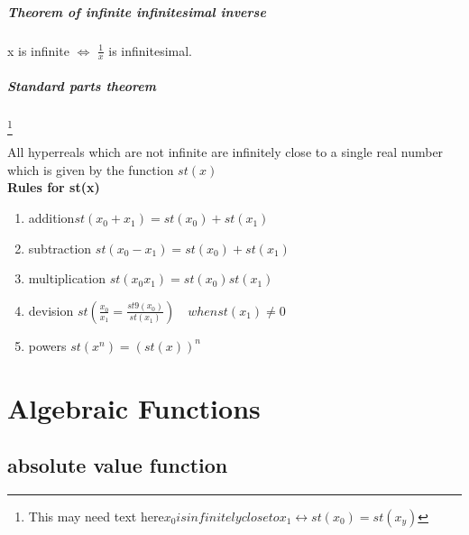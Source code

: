 \documentclass[12pt, a4paper,oneside]{book}
\begin{document}
\paragraph{Theorem of infinite infinitesimal inverse }
\begin{paragraph}
x is infinite  \(\Leftrightarrow \) \(\frac{1}{x}\) is infinitesimal.
\end{paragraph}
\paragraph{Standard parts theorem} \footnote{ This may need text here\(x_0 is infinitely close to x_1 \leftrightarrow st(x_0)=st(x_y)\)}
\begin{paragraph}
 All hyperreals which are not infinite are infinitely close to a single real number which is given by the function \(st(x)\) \\
 \textbf{Rules for st(x)}
 \begin{enumerate}
 \item{addition\(st(x_0+x_1)=st(x_0)+st(x_1)\)}
 \item{subtraction \(st(x_0-x_1) = st(x_0)+st(x_1)\)}
 \item{multiplication \(st(x_0 x_1) = st(x_0)st(x_1)\)}
 \item{devision \(st(\frac{x_0}{x_1}=\frac{st9(x_0)}{st(x_1)})\quad when st(x_1)\neq 0\)}
 \item{powers \(st(x^n)=(st(x))^n\) }%
 \end{enumerate}
\end{paragraph}

\chapter{Algebraic Functions}
              \section{absolute value  function}
\end{document}
